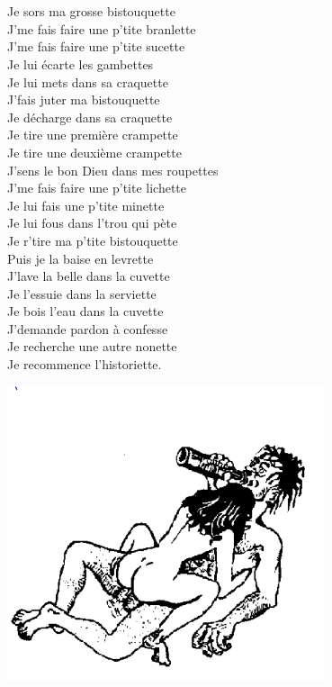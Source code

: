 \\\\Je sors ma grosse bistouquette
\\J'me fais faire une p'tite branlette
\\J'me fais faire une p'tite sucette
\\Je lui écarte les gambettes
\\Je lui mets dans sa craquette
\\J'fais juter ma bistouquette
\\Je décharge dans sa craquette
\\Je tire une première crampette
\\Je tire une deuxième crampette
\\J'sens le bon Dieu dans mes roupettes
\\J'me fais faire une p'tite lichette
\\Je lui fais une p'tite minette
\\Je lui fous dans l'trou qui pète
\\Je r'tire ma p'tite bistouquette
\\Puis je la baise en levrette
\\J'lave la belle dans la cuvette
\\Je l'essuie dans la serviette
\\Je bois l'eau dans la cuvette
\\J'demande pardon à confesse
\\Je recherche une autre nonette
\\Je recommence l'historiette.
\\
\bigskip
\begin{center}
\includegraphics[width=0.7\textwidth]{images/image1.PNG}
\end{center}
\breakpage